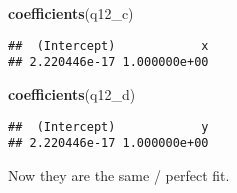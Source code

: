 \documentclass[
]{article}
\newenvironment{Shaded}{\begin{snugshade}}{\end{snugshade}}
\newcommand{\FunctionTok}[1]{\textcolor[rgb]{0.13,0.29,0.53}{\textbf{#1}}}
\newcommand{\NormalTok}[1]{#1}
\begin{document}
\begin{Shaded}
\begin{Highlighting}[]
\FunctionTok{coefficients}\NormalTok{(q12\_c)}
\end{Highlighting}
\end{Shaded}

\begin{verbatim}
##  (Intercept)            x 
## 2.220446e-17 1.000000e+00
\end{verbatim}

\begin{Shaded}
\begin{Highlighting}[]
\FunctionTok{coefficients}\NormalTok{(q12\_d)}
\end{Highlighting}
\end{Shaded}

\begin{verbatim}
##  (Intercept)            y 
## 2.220446e-17 1.000000e+00
\end{verbatim}

Now they are the same / perfect fit.
\end{document}

